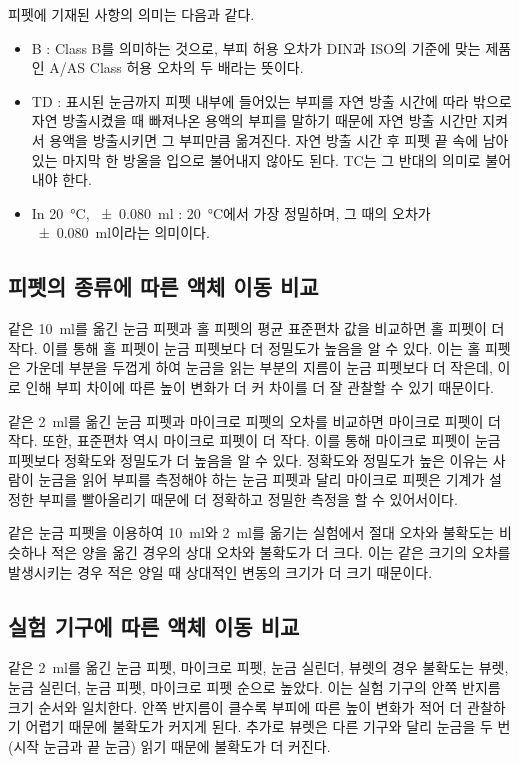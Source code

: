 \documentclass{GSHS-chemexp}
\begin{document}
	피펫에 기재된 사항의 의미는 다음과 같다.
	\begin{itemize}
		\item B : Class B를 의미하는 것으로,
		부피 허용 오차가 DIN과 ISO의 기준에 맞는 제품인
		A/AS Class 허용 오차의 두 배라는 뜻이다.
		\item TD : 표시된 눈금까지 피펫 내부에 들어있는 부피를
		자연 방출 시간에 따라 밖으로 자연 방출시켰을 때
		빠져나온 용액의 부피를 말하기 때문에
		자연 방출 시간만 지켜서 용액을 방출시키면 그 부피만큼 옮겨진다.
		자연 방출 시간 후 피펫 끝 속에 남아있는 마지막 한 방울을
		입으로 불어내지 않아도 된다. TC는 그 반대의 의미로
		불어내야 한다.
		\item In \SI{20}{\degreeCelsius}, \SI{+-0.080}{\milli\litre} :
		\SI{20}{\degreeCelsius}에서 가장 정밀하며,
		그 때의 오차가 \SI{+-0.080}{\milli\litre}이라는 의미이다.
	\end{itemize}
	
	\subsection{피펫의 종류에 따른 액체 이동 비교}
	같은 \SI{10}{\milli\litre}를 옮긴 눈금 피펫과 홀 피펫의
	평균 표준편차 값을 비교하면 홀 피펫이 더 작다.
	이를 통해 홀 피펫이 눈금 피펫보다 더 정밀도가 높음을 알 수 있다.
	이는 홀 피펫은 가운데 부분을 두껍게 하여 눈금을 읽는 부분의 지름이
	눈금 피펫보다 더 작은데, 이로 인해 부피 차이에 따른 높이 변화가 더 커
	차이를 더 잘 관찰할 수 있기 때문이다.
	
	같은 \SI{2}{\milli\litre}를 옮긴 눈금 피펫과 마이크로 피펫의
	오차를 비교하면 마이크로 피펫이 더 작다.
	또한, 표준편차 역시 마이크로 피펫이 더 작다.
	이를 통해 마이크로 피펫이 눈금 피펫보다
	정확도와 정밀도가 더 높음을 알 수 있다.
	정확도와 정밀도가 높은 이유는 사람이 눈금을 읽어 부피를 측정해야 하는
	눈금 피펫과 달리 마이크로 피펫은 기계가 설정한 부피를 빨아올리기 때문에
	더 정확하고 정밀한 측정을 할 수 있어서이다.
	
	같은 눈금 피펫을 이용하여 \SI{10}{\milli\litre}와 \SI{2}{\milli\litre}를
	옮기는 실험에서 절대 오차와 불확도는 비슷하나 적은 양을 옮긴 경우의
	상대 오차와 불확도가 더 크다. 이는 같은 크기의 오차를 발생시키는 경우
	적은 양일 때 상대적인 변동의 크기가 더 크기 때문이다.
	
	\subsection{실험 기구에 따른 액체 이동 비교}
	같은 \SI{2}{\milli\litre}를 옮긴 눈금 피펫, 마이크로 피펫,
	눈금 실린더, 뷰렛의 경우 불확도는 뷰렛, 눈금 실린더, 눈금 피펫,
	마이크로 피펫 순으로 높았다. 이는 실험 기구의 안쪽 반지름
	크기 순서와 일치한다. 안쪽 반지름이 클수록 부피에 따른 높이 변화가
	적어 더 관찰하기 어렵기 때문에 불확도가 커지게 된다.
	추가로 뷰렛은 다른 기구와 달리 눈금을 두 번(시작 눈금과 끝 눈금)
	읽기 때문에 불확도가 더 커진다.
	
\end{document}

